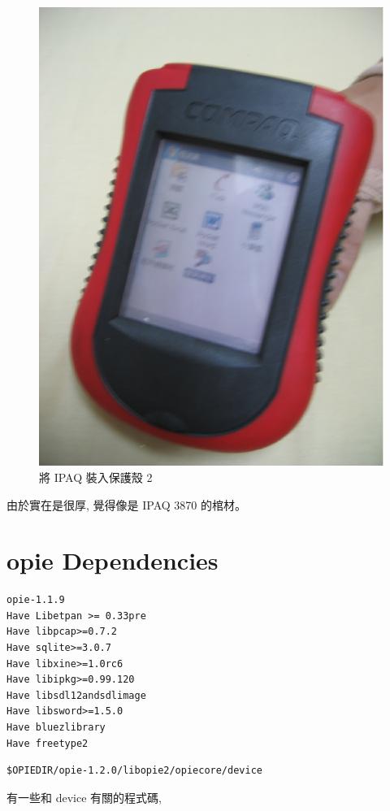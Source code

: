 \documentclass[12pt,a4paper]{article}
\begin{document}
\begin{CJK}{UTF8}{bsmi}
\begin{figure}[htbp]
\includegraphics[scale=0.35]{eps/shell_7.eps}
\caption{將 IPAQ 裝入保護殼 2}
\end{figure}

由於實在是很厚, 覺得像是 IPAQ 3870 的棺材。

\section{opie Dependencies}
\begin{verbatim}
opie-1.1.9
Have Libetpan >= 0.33pre
Have libpcap>=0.7.2
Have sqlite>=3.0.7
Have libxine>=1.0rc6
Have libipkg>=0.99.120
Have libsdl12andsdlimage
Have libsword>=1.5.0
Have bluezlibrary
Have freetype2
\end{verbatim}


\begin{verbatim}
$OPIEDIR/opie-1.2.0/libopie2/opiecore/device
\end{verbatim}
有一些和 device 有關的程式碼,


\end{CJK}
\end{document}
